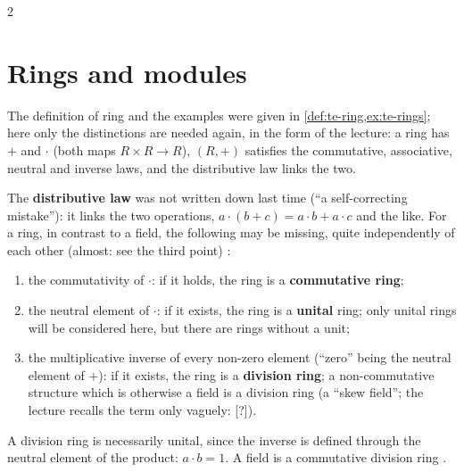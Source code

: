 \begin{paracol}{2}
\section{Rings and modules}\label{sec:rm-rings}

\begin{recall}[Rings]
The definition of ring and the examples were given in \cref{def:te-ring,ex:te-rings}; here only the distinctions are needed again, in the form of the lecture: a ring has $+$ and $\cdot$ (both maps $R\times R\to R$), $(R,+)$ satisfies the commutative, associative, neutral and inverse laws, and the distributive law links the two.
\end{recall}
The \textbf{distributive law} was not written down last time (``a self-correcting mistake''): it links the two operations, $a\cdot(b+c)=a\cdot b+a\cdot c$ and the like. For a ring, in contrast to a field, the following may be missing, quite independently of each other (almost: see the third point)   :
\begin{enumerate}
  \item the commutativity of $\cdot$: if it holds, the ring is a \textbf{commutative ring};
  \item the neutral element of $\cdot$: if it exists, the ring is a \textbf{unital} ring; only unital rings will be considered here, but there are rings without a unit;
  \item the multiplicative inverse of every non-zero element (``zero'' being the neutral element of $+$): if it exists, the ring is a \textbf{division ring}; a non-commutative structure which is otherwise a field is a division ring (a ``skew field''; the lecture recalls the term only vaguely: [?]).
\end{enumerate}
A division ring is necessarily unital, since the inverse is defined through the neutral element of the product: $a\cdot b=1$. A field is a commutative division ring       .


\end{paracol}
